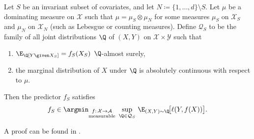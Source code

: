\begin{proposition} \label{prop:adversarial}
Let $S$ be an invariant subset of covariates, and let
$N \coloneq \{1, \ldots, d\} \setminus S$. Let $\mu$ be a dominating measure
on $\mathcal{X}$ such that $\mu = \mu_S \otimes \mu_N$ for some
measures $\mu_S$ on $\mathcal{X}_S$ and $\mu_N$ on $\mathcal{X}_N$
(such as Lebesgue or counting measures). Define $\mathcal{Q}_S$ to be
the family of all joint distributions $\Q$ of $(X,Y)$ on
$\mathcal{X} \times \mathcal{Y}$ such that
\begin{enumerate}[label=(\roman*)]
  \item $\E_\Q[Y \given X_S] = f_S(X_S)$ \quad $\Q$-almost surely,
  \item the marginal distribution of $X$ under $\Q$ is absolutely
        continuous with respect to $\mu$.
\end{enumerate}
Then the predictor $f_S$ satisfies
$$
  f_S \in
  \argmin_{\substack{f:\,\mathcal{X}\to\mathcal{A}\\
                      \mathrm{measurable}}}\;
  \sup_{\Q \in \mathcal{Q}_S}\,
  \E_{(X,Y)\sim\Q}\!\big[\ell(Y, f(X))\big].
$$
\end{proposition}
A proof can be found in .




